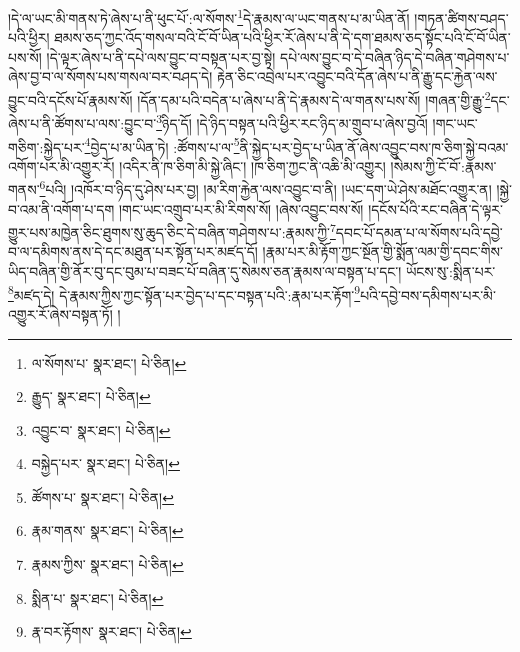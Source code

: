 །དེ་ལ་ཡང་མི་གནས་ཏེ་ཞེས་པ་ནི་ཕུང་པོ་:ལ་སོགས་\footnote{ལ་སོགས་པ་  སྣར་ཐང་།  པེ་ཅིན། }དེ་རྣམས་ལ་ཡང་གནས་པ་མ་ཡིན་ནོ། །གཏན་ཚིགས་བཤད་པའི་ཕྱིར། ཐམས་ཅད་ཀྱང་འོད་གསལ་བའི་ངོ་བོ་ཡིན་པའི་ཕྱིར་རོ་ཞེས་པ་ནི་དེ་དག་ཐམས་ཅད་སྟོང་པའི་ངོ་བོ་ཡིན་པས་སོ། །དེ་ལྟར་ཞེས་པ་ནི་དཔེ་ལས་བྱུང་བ་བསྟན་པར་བྱ་སྟེ། དཔེ་ལས་བྱུང་བ་དེ་བཞིན་ཉིད་དེ་བཞིན་གཤེགས་པ་ཞེས་བྱ་བ་ལ་སོགས་པས་གསལ་བར་བཤད་དེ། རྟེན་ཅིང་འབྲེལ་པར་འབྱུང་བའི་དོན་ཞེས་པ་ནི་རྒྱུ་དང་རྐྱེན་ལས་བྱུང་བའི་དངོས་པོ་རྣམས་སོ། །དོན་དམ་པའི་བདེན་པ་ཞེས་པ་ནི་དེ་རྣམས་དེ་ལ་གནས་པས་སོ། །གཞན་གྱི་རྒྱུ་\footnote{རྒྱུད་  སྣར་ཐང་།  པེ་ཅིན། }དང་ཞེས་པ་ནི་ཚོགས་པ་ལས་:བྱུང་བ་\footnote{འབྱུང་བ་  སྣར་ཐང་།  པེ་ཅིན། }ཉིད་དོ། །དེ་ཉིད་བསྟན་པའི་ཕྱིར་རང་ཉིད་མ་གྲུབ་པ་ཞེས་བྱའོ། །གང་ཡང་གཅིག་:སྐྱེད་པར་\footnote{བསྐྱེད་པར་  སྣར་ཐང་།  པེ་ཅིན། }བྱེད་པ་མ་ཡིན་ཏེ། :ཚོགས་པ་ལ་\footnote{ཚོགས་པ་  སྣར་ཐང་།  པེ་ཅིན། }ནི་སྐྱེད་པར་བྱེད་པ་ཡིན་ནོ་ཞེས་འབྱུང་བས་ཁ་ཅིག་སྐྱེ་བའམ་འགོག་པར་མི་འགྱུར་རོ། །འདིར་ནི་ཁ་ཅིག་མི་སྐྱེ་ཞིང་། །ཁ་ཅིག་ཀྱང་ནི་འཆི་མི་འགྱུར། །སེམས་ཀྱི་ངོ་བོ་:རྣམས་གནས་\footnote{རྣམ་གནས་  སྣར་ཐང་།  པེ་ཅིན། }པའི། །འཁོར་བ་ཉིད་དུ་ཤེས་པར་བྱ། །མ་རིག་རྐྱེན་ལས་འབྱུང་བ་ནི། །ཡང་དག་ཡེ་ཤེས་མཐོང་འགྱུར་ན། །སྐྱེ་བ་འམ་ནི་འགོག་པ་དག །གང་ཡང་འགྲུབ་པར་མི་རིགས་སོ། །ཞེས་འབྱུང་བས་སོ། །དངོས་པོའི་རང་བཞིན་དེ་ལྟར་གྱུར་པས་མཁྱེན་ཅིང་ཐུགས་སུ་ཆུད་ཅིང་དེ་བཞིན་གཤེགས་པ་:རྣམས་ཀྱི་\footnote{རྣམས་ཀྱིས་  སྣར་ཐང་།  པེ་ཅིན། }དབང་པོ་དམན་པ་ལ་སོགས་པའི་དབྱེ་བ་ལ་དམིགས་ནས་དེ་དང་མཐུན་པར་སྟོན་པར་མཛད་དོ། །རྣམ་པར་མི་རྟོག་ཀྱང་སྔོན་གྱི་སྨོན་ལམ་གྱི་དབང་གིས་ཡིད་བཞིན་གྱི་ནོར་བུ་དང་བུམ་པ་བཟང་པོ་བཞིན་དུ་སེམས་ཅན་རྣམས་ལ་བསྟན་པ་དང་། ཡོངས་སུ་:སྨིན་པར་\footnote{སྨིན་པ་  སྣར་ཐང་།  པེ་ཅིན། }མཛད་དེ། དེ་རྣམས་ཀྱིས་ཀྱང་སྟོན་པར་བྱེད་པ་དང་བསྟན་པའི་:རྣམ་པར་རྟོག་\footnote{རྣ་བར་རྟོགས་  སྣར་ཐང་།  པེ་ཅིན། }པའི་དབྱེ་བས་དམིགས་པར་མི་འགྱུར་རོ་ཞེས་བསྟན་ཏོ། །
